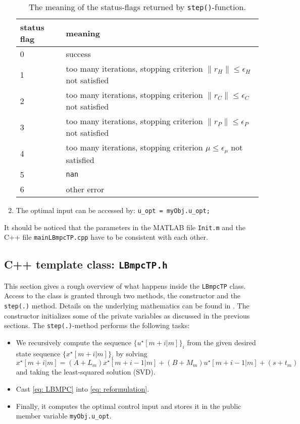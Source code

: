 \documentclass[letter]{article}
\begin{document}
\begin{sffamily}
\begin{enumerate}
	\begin{table}[!htdp]
	\caption{The meaning of the status-flags returned by \texttt{step()}-function.}
	\begin{center}
	\begin{tabular}{|l|l|}\hline
	{
	 \bf status flag} & meaning  \\ \hline\hline
	 0 & success \\
	 1 & too many iterations, stopping criterion $\|r_H\| \leq \epsilon_H$ not satisfied\\
	 2 & too many iterations, stopping criterion $\|r_C\| \leq \epsilon_C$ not satisfied \\
	 3 & too many iterations, stopping criterion $\|r_P\| \leq \epsilon_P$ not satisfied \\
	 4 & too many iterations, stopping criterion $\mu \leq \epsilon_\mu$ not satisfied \\
	 5 & \texttt{nan} \\
	 6 & other error \\ \hline
	\end{tabular}
	\end{center}
	\label{tab: error code}
	\end{table}
	
	\item The optimal input can be accessed by: \texttt{u\_opt = myObj.u\_opt;}
\end{enumerate}


\noindent
It should be noticed that the parameters in the MATLAB file \texttt{Init.m} and the C++ file \texttt{mainLBmpcTP.cpp} have to be consistent with each other.



\subsection{C++ template class: \texttt{LBmpcTP.h}}
This section gives a rough overview of what happens inside the \texttt{LBmpcTP} class. Access to the class is granted through two methods, the constructor and the \texttt{step(.)} method. Details on the underlying mathematics can be found in \citep{Mehrotra1992PDIPM, Potra2000IPM, Rao98IMP2MPC, Nocedal2000NumOpt}. The constructor initializes some of the private variables as discussed in the previous sections. The \texttt{step(.)}-method performs the following tasks:
\begin{itemize}
	\item We recursively compute the sequence $\{  u^\star[m+i|m]  \}_i$ from the given desired state sequence $\{ x^\star[m+i|m] \}_i$ by solving 
	\begin{equation*}
			x^\star [m+i|m] = (A+L_m)x^\star[m+i-1|m] + (B+M_m)u^\star[m+i-1|m] + (s+t_m)
	\end{equation*}
	and taking the least-squared solution (SVD).
	\item Cast \eqref{eq: LBMPC} into \eqref{eq: reformulation}.
	\item Finally, it computes the optimal control input and stores it in the public member variable \texttt{myObj.u\_opt}.
\end{itemize}



\end{sffamily}
\end{document}
